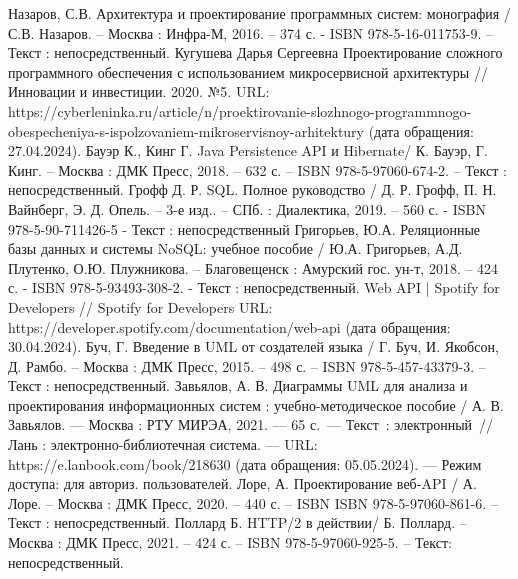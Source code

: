 \begin{thebibliography}{9}
     Назаров, С.В. Архитектура и проектирование программных систем: монография / С.В. Назаров. – Москва : Инфра-М, 2016. – 374 с. - ISBN 978-5-16-011753-9. – Текст : непосредственный.
     Кугушева Дарья Сергеевна Проектирование сложного программного обеспечения с использованием микросервисной архитектуры // Инновации и инвестиции. 2020. №5. URL: https://cyberleninka.ru/article/n/proektirovanie-slozhnogo-programmnogo-obespecheniya-s-ispolzovaniem-mikroservisnoy-arhitektury (дата обращения: 27.04.2024).
     Бауэр К., Кинг Г. Java Persistence API и Hibernate/ К. Бауэр, Г. Кинг. – Москва : ДМК Пресс, 2018. – 632 с. – ISBN 978-5-97060-674-2. – Текст : непосредственный.
     Грофф Д. Р. SQL. Полное руководство / Д. Р. Грофф, П. Н. Вайнберг, Э. Д. Опель. – 3-е изд.. – СПб. : Диалектика, 2019. – 560 с. - ISBN 978-5-90-711426-5 - Текст : непосредственный
     Григорьев, Ю.А. Реляционные базы данных и системы NoSQL: учебное пособие / Ю.А. Григорьев, А.Д. Плутенко, О.Ю. Плужникова. – Благовещенск : Амурский гос. ун-т, 2018. – 424 с. - ISBN 978-5-93493-308-2. - Текст : непосредственный.
     Web API | Spotify for Developers // Spotify for Developers URL: https://developer.spotify.com/documentation/web-api (дата обращения: 30.04.2024).
     Буч, Г. Введение в UML от создателей языка / Г. Буч, И. Якобсон, Д. Рамбо. – Москва : ДМК Пресс, 2015. – 498 с. – ISBN 978-5-457-43379-3. – Текст : непосредственный.
     Завьялов, А. В. Диаграммы UML для анализа и проектирования информационных систем : учебно-методическое пособие / А. В. Завьялов. — Москва : РТУ МИРЭА, 2021. — 65 с. — Текст : электронный // Лань : электронно-библиотечная система. — URL: https://e.lanbook.com/book/218630 (дата обращения: 05.05.2024). — Режим доступа: для авториз. пользователей.
     Лоре, А. Проектирование веб-API / А. Лоре. – Москва : ДМК Пресс, 2020. – 440 с. – ISBN ISBN 978-5-97060-861-6. – Текст : непосредственный.
     Поллард Б. HTTP/2 в действии/ Б. Поллард. – Москва : ДМК Пресс, 2021. – 424 с. – ISBN 978-5-97060-925-5. – Текст: непосредственный.
    
\end{thebibliography}
